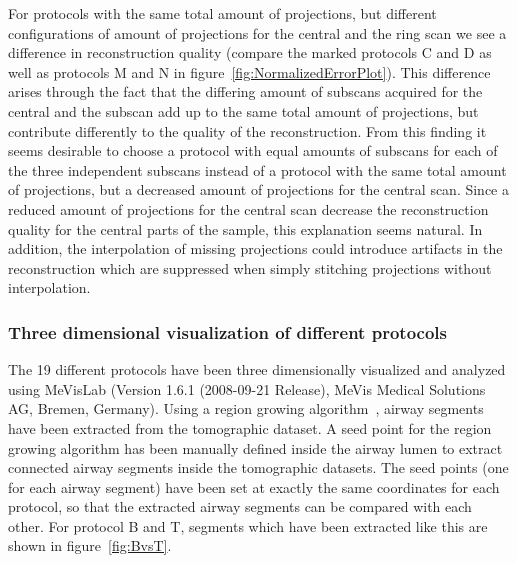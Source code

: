 For protocols with the same total amount of projections, but different configurations of amount of projections for the central and the ring scan we see a difference in reconstruction quality (compare the marked protocols C and D as well as protocols M and N in figure~\ref{fig:NormalizedErrorPlot}). This difference arises through the fact that the differing amount of subscans acquired for the central and the subscan add up to the same total amount of projections, but contribute differently to the quality of the reconstruction. From this finding it seems desirable to choose a protocol with equal amounts of subscans for each of the three independent subscans instead of a protocol with the same total amount of projections, but a decreased amount of projections for the central scan. Since a reduced amount of projections for the central scan decrease the reconstruction quality for the central parts of the sample, this explanation seems natural. In addition, the interpolation of missing projections could introduce artifacts in the reconstruction which are suppressed when simply stitching projections without interpolation.

\subsubsection{Three dimensional visualization of different protocols}%
\label{subsec:comparison}%
The 19 different protocols have been three dimensionally visualized and analyzed using MeVisLab (Version 1.6.1 (2008-09-21 Release), MeVis Medical Solutions AG, Bremen, Germany). Using a region growing algorithm~\cite{wiki:regiongrowing}, airway segments have been extracted from the tomographic dataset.  A seed point for the region growing algorithm has been manually defined inside the airway lumen to extract connected airway segments inside the tomographic datasets. The seed points (one for each airway segment) have been set at exactly the same coordinates for each protocol, so that the extracted airway segments can be compared with each other. For protocol B and T, segments which have been extracted like this are shown in figure~\ref{fig:BvsT}.

